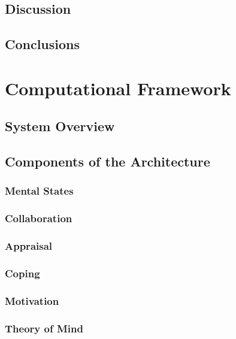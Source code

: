 \documentclass[12pt]{report}
\begin{document}
\section{Discussion}
\label{sec:discussion-crowdsourcing}

\section{Conclusions}
\label{sec:conclusions-crowdsourcing}

\chapter{Computational Framework}
\label{ch:framework}

\section{System Overview}

\section{Components of the Architecture}

\subsection{Mental States}

\subsection{Collaboration}

\subsection{Appraisal}

\subsection{Coping}

\subsection{Motivation}

\subsection{Theory of Mind}
\end{document}
